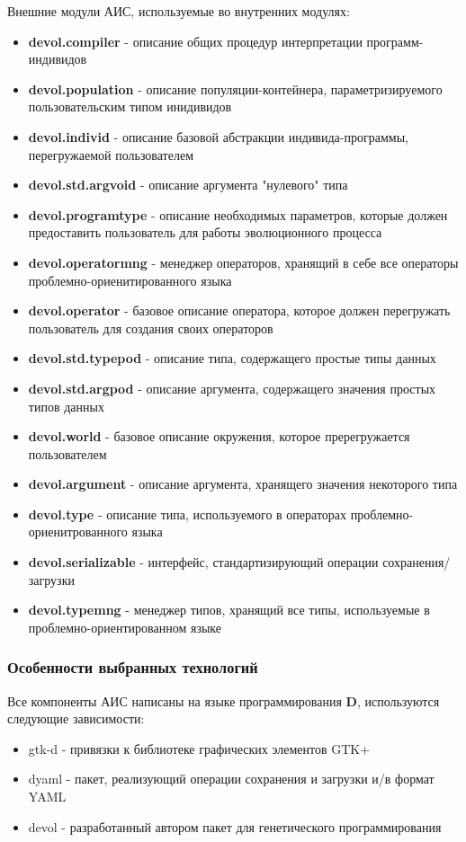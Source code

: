 \documentclass[russian,utf8,emptystyle]{eskdtext}
\begin{document}
\begin{spacing}{1.5}
Внешние модули АИС, используемые во внутренних модулях:
\begin{itemize}
\item \textbf{devol.compiler} - описание общих процедур интерпретации программ-индивидов
\item \textbf{devol.population} - описание популяции-контейнера, параметризируемого пользовательским типом инидивидов
\item \textbf{devol.individ} - описание базовой абстракции индивида-программы, перегружаемой пользователем
\item \textbf{devol.std.argvoid} - описание аргумента "нулевого" типа
\item \textbf{devol.programtype} - описание необходимых параметров, которые должен предоставить пользователь для работы эволюционного процесса
\item \textbf{devol.operatormng} - менеджер операторов, хранящий в себе все операторы проблемно-ориенитированного языка
\item \textbf{devol.operator} - базовое описание оператора, которое должен перегружать пользователь для создания своих операторов
\item \textbf{devol.std.typepod} - описание типа, содержащего простые типы данных
\item \textbf{devol.std.argpod} - описание аргумента, содержащего значения простых типов данных
\item \textbf{devol.world} - базовое описание окружения, которое пререгружается пользователем
\item \textbf{devol.argument} - описание аргумента, хранящего значения некоторого типа
\item \textbf{devol.type} - описание типа, используемого в операторах проблемно-ориенитрованного языка
\item \textbf{devol.serializable} - интерфейс, стандартизирующий операции сохранения/загрузки
\item \textbf{devol.typemng} - менеджер типов, хранящий все типы, используемые в проблемно-ориентированном языке
\end{itemize}

\subsubsection{Особенности выбранных технологий}
Все компоненты АИС написаны на языке программирования \textbf{D}, используются следующие зависимости:
\begin{itemize}
\item gtk-d - привязки к библиотеке графических элементов GTK+
\item dyaml - пакет, реализующий операции сохранения и загрузки и/в формат YAML
\item devol - разработанный автором пакет для генетического программирования
\end{itemize}


\end{spacing}
\end{document}

